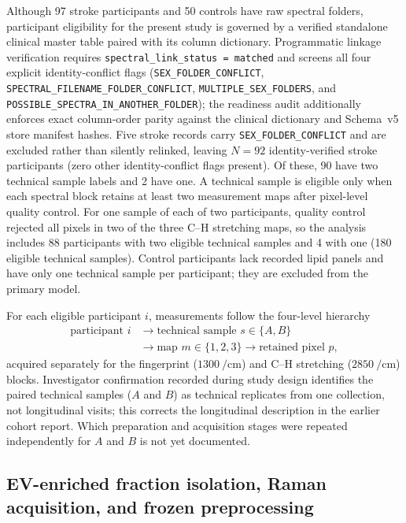 \documentclass[preprint,12pt]{elsarticle}
\begin{document}
Although 97 stroke participants and 50 controls have raw spectral folders, participant eligibility for the present study is governed by a verified standalone clinical master table paired with its column dictionary. Programmatic linkage verification requires \texttt{spectral\_link\_status = matched} and screens all four explicit identity-conflict flags (\texttt{SEX\_\allowbreak{}FOLDER\_\allowbreak{}CONFLICT}, \texttt{SPECTRAL\_\allowbreak{}FILENAME\_\allowbreak{}FOLDER\_\allowbreak{}CONFLICT}, \texttt{MULTIPLE\_\allowbreak{}SEX\_\allowbreak{}FOLDERS}, and \texttt{POSSIBLE\_\allowbreak{}SPECTRA\_\allowbreak{}IN\_\allowbreak{}ANOTHER\_\allowbreak{}FOLDER}); the readiness audit additionally enforces exact column-order parity against the clinical dictionary and Schema~v5 store manifest hashes. Five stroke records carry \texttt{SEX\_FOLDER\_CONFLICT} and are excluded rather than silently relinked, leaving $N = 92$ identity-verified stroke participants (zero other identity-conflict flags present). Of these, 90 have two technical sample labels and 2 have one. A technical sample is eligible only when each spectral block retains at least two measurement maps after pixel-level quality control. For one sample of each of two participants, quality control rejected all pixels in two of the three C--H stretching maps, so the analysis includes 88 participants with two eligible technical samples and 4 with one (180 eligible technical samples). Control participants lack recorded lipid panels and have only one technical sample per participant; they are excluded from the primary model.

For each eligible participant $i$, measurements follow the four-level hierarchy
\[
\begin{aligned}
\text{participant } i &\longrightarrow \text{technical sample } s \in \{A,B\} \\
&\longrightarrow \text{map } m \in \{1,2,3\}
\longrightarrow \text{retained pixel } p,
\end{aligned}
\]
acquired separately for the fingerprint ($1300~\si{\per\centi\metre}$) and C--H stretching ($2850~\si{\per\centi\metre}$) blocks. Investigator confirmation recorded during study design identifies the paired technical samples ($A$ and $B$) as technical replicates from one collection, not longitudinal visits; this corrects the longitudinal description in the earlier cohort report. Which preparation and acquisition stages were repeated independently for $A$ and $B$ is not yet documented.

\subsection{EV-enriched fraction isolation, Raman acquisition, and frozen preprocessing}
\label{subsec:acquisition}
\end{document}
